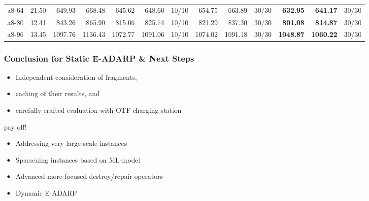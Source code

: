 \documentclass[aspectratio=1610]{beamer}
\begin{document}
\begin{frame}
\begin{table}[]
{\begin{tabular}{lrrrrrrrrrrrr}
a8-64                                          & 21.50                                                        & 649.93  & \multicolumn{1}{r|}{668.48}   & 645.62  & 648.60   & \multicolumn{1}{r|}{10/10} & 654.75  & 663.89   & \multicolumn{1}{r|}{30/30} & \textbf{632.95}  & {\color[HTML]{FE0000} \textbf{641.17}}  & 30/30 \\
a8-80                                          & 12.41                                                        & 843.26  & \multicolumn{1}{r|}{865.90}   & 815.06  & 825.74   & \multicolumn{1}{r|}{10/10} & 821.29  & 837.30   & \multicolumn{1}{r|}{30/30} & \textbf{801.08}  & {\color[HTML]{FE0000} \textbf{814.87}}  & 30/30 \\
a8-96                                          & 13.45                                                        & 1097.76 & \multicolumn{1}{r|}{1136.43}  & 1072.77 & 1091.06  & \multicolumn{1}{r|}{10/10} & 1074.02 & 1091.18  & \multicolumn{1}{r|}{30/30} & \textbf{1048.87} & {\color[HTML]{FE0000} \textbf{1060.22}} & 30/30 \\ \hline
\end{tabular}%
}
\end{table}
\end{frame}


\begin{frame}
	\frametitle{Conclusion for Static E-ADARP \& Next Steps}

\begin{itemize}
	\item Independent consideration of fragments,
	\item caching of their results, and 
	\item carefully crafted evaluation with OTF charging station
\end{itemize}
pay off!

\bigskip 

\begin{itemize}
	\item Addressing very large-scale instances
	\item Sparsening instances based on ML-model
	\item Advanced more focused destroy/repair operators 
	\item Dynamic E-ADARP 
\end{itemize}
	
\end{frame}
\end{document}

